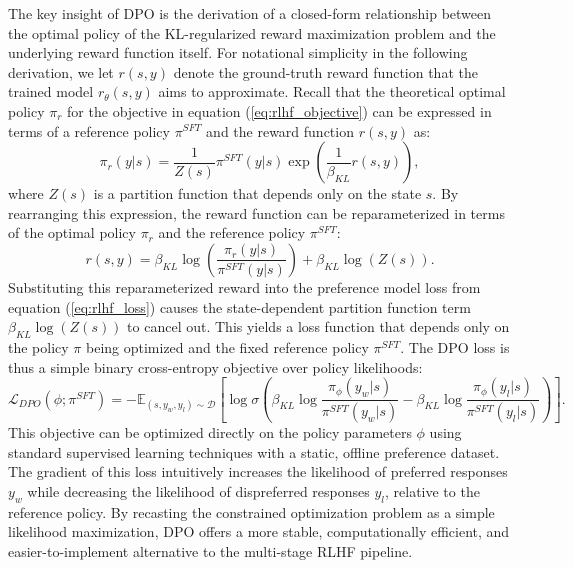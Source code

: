 The key insight of DPO is the derivation of a closed-form relationship between the optimal policy of the KL-regularized reward maximization problem and the underlying reward function itself. For notational simplicity in the following derivation, we let $r(s,y)$ denote the ground-truth reward function that the trained model $r_\theta(s,y)$ aims to approximate. Recall that the theoretical optimal policy $\pi_r$ for the objective in equation (\ref{eq:rlhf_objective}) can be expressed in terms of a reference policy $\pi^{SFT}$ and the reward function $r(s,y)$ as:
\begin{equation}
    \pi_r(y|s) = \frac{1}{Z(s)} \pi^{SFT}(y|s) \exp\left(\frac{1}{\beta_{KL}} r(s,y)\right),
\label{eq:dpo_optimal_policy}
\end{equation}
where $Z(s)$ is a partition function that depends only on the state $s$. By rearranging this expression, the reward function can be reparameterized in terms of the optimal policy $\pi_r$ and the reference policy $\pi^{SFT}$:
\begin{equation}
    r(s,y) = \beta_{KL} \log\left(\frac{\pi_r(y|s)}{\pi^{SFT}(y|s)}\right) + \beta_{KL} \log(Z(s)).
\label{eq:dpo_reparameterize}
\end{equation}
Substituting this reparameterized reward into the preference model loss from equation (\ref{eq:rlhf_loss}) causes the state-dependent partition function term $\beta_{KL} \log(Z(s))$ to cancel out. This yields a loss function that depends only on the policy $\pi$ being optimized and the fixed reference policy $\pi^{SFT}$. The DPO loss is thus a simple binary cross-entropy objective over policy likelihoods:
\begin{equation}
    \mathcal{L}_{DPO}(\phi; \pi^{SFT}) = -\mathbb{E}_{(s, y_w, y_l) \sim \mathcal{D}} \left[ \log \sigma \left( \beta_{KL} \log \frac{\pi_\phi(y_w|s)}{\pi^{SFT}(y_w|s)} - \beta_{KL} \log \frac{\pi_\phi(y_l|s)}{\pi^{SFT}(y_l|s)} \right) \right].
\label{eq:dpo_loss}
\end{equation}
This objective can be optimized directly on the policy parameters $\phi$ using standard supervised learning techniques with a static, offline preference dataset. The gradient of this loss intuitively increases the likelihood of preferred responses $y_w$ while decreasing the likelihood of dispreferred responses $y_l$, relative to the reference policy. By recasting the constrained optimization problem as a simple likelihood maximization, DPO offers a more stable, computationally efficient, and easier-to-implement alternative to the multi-stage RLHF pipeline.

